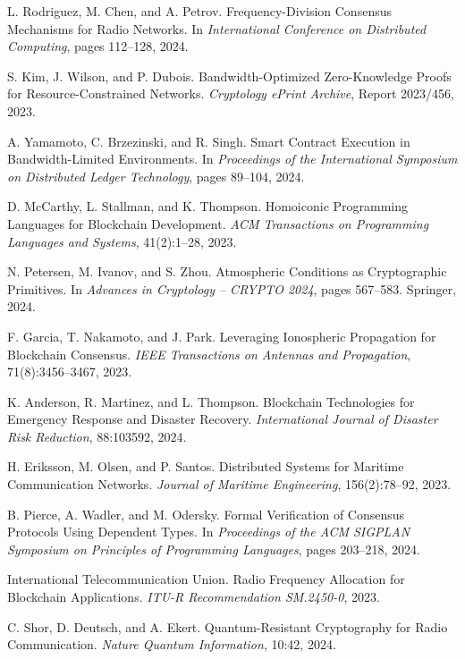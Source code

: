 \documentclass[11pt,a4paper]{article}
\begin{document}
\begin{thebibliography}{99}
L. Rodriguez, M. Chen, and A. Petrov.
\newblock Frequency-Division Consensus Mechanisms for Radio Networks.
\newblock In \emph{International Conference on Distributed Computing}, pages 112--128, 2024.

S. Kim, J. Wilson, and P. Dubois.
\newblock Bandwidth-Optimized Zero-Knowledge Proofs for Resource-Constrained Networks.
\newblock \emph{Cryptology ePrint Archive}, Report 2023/456, 2023.

A. Yamamoto, C. Brzezinski, and R. Singh.
\newblock Smart Contract Execution in Bandwidth-Limited Environments.
\newblock In \emph{Proceedings of the International Symposium on Distributed Ledger Technology}, pages 89--104, 2024.

D. McCarthy, L. Stallman, and K. Thompson.
\newblock Homoiconic Programming Languages for Blockchain Development.
\newblock \emph{ACM Transactions on Programming Languages and Systems}, 41(2):1--28, 2023.

N. Petersen, M. Ivanov, and S. Zhou.
\newblock Atmospheric Conditions as Cryptographic Primitives.
\newblock In \emph{Advances in Cryptology -- CRYPTO 2024}, pages 567--583. Springer, 2024.

F. Garcia, T. Nakamoto, and J. Park.
\newblock Leveraging Ionospheric Propagation for Blockchain Consensus.
\newblock \emph{IEEE Transactions on Antennas and Propagation}, 71(8):3456--3467, 2023.

K. Anderson, R. Martinez, and L. Thompson.
\newblock Blockchain Technologies for Emergency Response and Disaster Recovery.
\newblock \emph{International Journal of Disaster Risk Reduction}, 88:103592, 2024.

H. Eriksson, M. Olsen, and P. Santos.
\newblock Distributed Systems for Maritime Communication Networks.
\newblock \emph{Journal of Maritime Engineering}, 156(2):78--92, 2023.

B. Pierce, A. Wadler, and M. Odersky.
\newblock Formal Verification of Consensus Protocols Using Dependent Types.
\newblock In \emph{Proceedings of the ACM SIGPLAN Symposium on Principles of Programming Languages}, pages 203--218, 2024.

International Telecommunication Union.
\newblock Radio Frequency Allocation for Blockchain Applications.
\newblock \emph{ITU-R Recommendation SM.2450-0}, 2023.

C. Shor, D. Deutsch, and A. Ekert.
\newblock Quantum-Resistant Cryptography for Radio Communication.
\newblock \emph{Nature Quantum Information}, 10:42, 2024.

\end{thebibliography}
\end{document}
